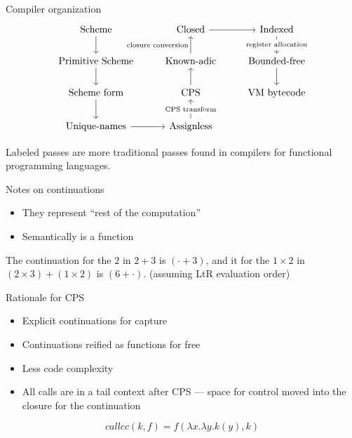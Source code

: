 \documentclass{beamer}
\begin{document}
\begin{frame}[fragile]{Compiler organization}
  \[\begin{tikzcd}
\text{Scheme} \arrow[d]           & \text{Closed} \arrow[r]      & \text{Indexed} \arrow[d, "\text{register allocation}" description]      \\
\text{Primitive Scheme} \arrow[d] & \text{Known-adic} \arrow[u, "\text{closure conversion}"]  & \text{Bounded-free} \arrow[d] \\
\text{Scheme form} \arrow[d]      & \text{CPS} \arrow[u]         & \text{VM bytecode}            \\
\text{Unique-names} \arrow[r]     & \text{Assignless} \arrow[u, "\text{CPS transform}" description] &                              
\end{tikzcd}\]

Labeled passes are more traditional passes found in compilers for functional programming languages.
\end{frame}

\begin{frame}{Notes on continuations}
  \begin{itemize}
  \item They represent ``rest of the computation''
  \item Semantically is a function
  \end{itemize}

  \begin{example}
    The continuation for the $2$ in $2+3$ is $(\cdot+3)$, and it for the $1\times2$ in $(2\times3)+(1\times2)$ is $(6+\cdot)$. (assuming LtR evaluation order)
  \end{example}
\end{frame}

\begin{frame}{Rationale for CPS}
  \begin{itemize}
  \item Explicit continuations for capture
  \item Continuations reified as functions for free
  \item Less code complexity
  \item All calls are in a tail context after CPS --- space for control moved into the closure for the continuation
  \end{itemize}
  
  \[callcc(k, f)=f(\lambda x.\lambda y.k(y), k)\]
\end{frame}
\end{document}
